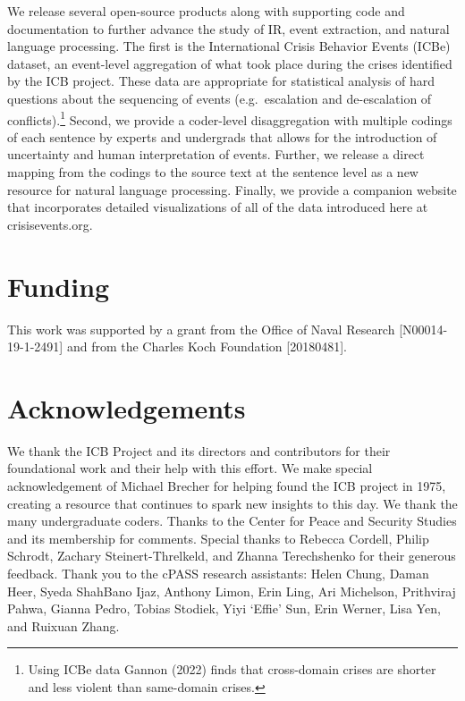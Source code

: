 \documentclass{article}
\begin{document}
We release several open-source products along with supporting code and
documentation to further advance the study of IR, event extraction, and
natural language processing. The first is the International Crisis
Behavior Events (ICBe) dataset, an event-level aggregation of what took
place during the crises identified by the ICB project. These data are
appropriate for statistical analysis of hard questions about the
sequencing of events (e.g.~escalation and de-escalation of
conflicts).\footnote{Using ICBe data Gannon (2022) finds that
  cross-domain crises are shorter and less violent than same-domain
  crises.} Second, we provide a coder-level disaggregation with multiple
codings of each sentence by experts and undergrads that allows for the
introduction of uncertainty and human interpretation of events. Further,
we release a direct mapping from the codings to the source text at the
sentence level as a new resource for natural language processing.
Finally, we provide a companion website that incorporates detailed
visualizations of all of the data introduced here at crisisevents.org.

\hypertarget{funding}{%
\section{Funding}\label{funding}}

This work was supported by a grant from the Office of Naval Research
{[}N00014-19-1-2491{]} and from the Charles Koch Foundation
{[}20180481{]}.

\hypertarget{acknowledgements}{%
\section{Acknowledgements}\label{acknowledgements}}

We thank the ICB Project and its directors and contributors for their
foundational work and their help with this effort. We make special
acknowledgement of Michael Brecher for helping found the ICB project in
1975, creating a resource that continues to spark new insights to this
day. We thank the many undergraduate coders. Thanks to the Center for
Peace and Security Studies and its membership for comments. Special
thanks to Rebecca Cordell, Philip Schrodt, Zachary Steinert-Threlkeld,
and Zhanna Terechshenko for their generous feedback. Thank you to the
cPASS research assistants: Helen Chung, Daman Heer, Syeda ShahBano Ijaz,
Anthony Limon, Erin Ling, Ari Michelson, Prithviraj Pahwa, Gianna Pedro,
Tobias Stodiek, Yiyi `Effie' Sun, Erin Werner, Lisa Yen, and Ruixuan
Zhang.
\end{document}
